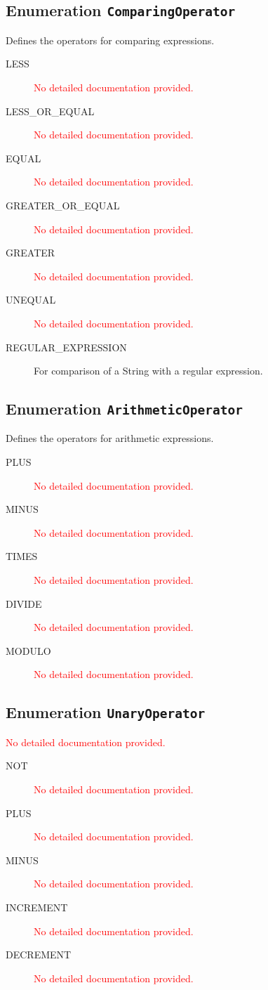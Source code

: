 \subsection{Enumeration \texttt{ComparingOperator}}
Defines the operators for comparing expressions.
\begin{description}
\item[LESS] \textcolor{red}{No detailed documentation provided.}
\item[LESS\_OR\_EQUAL] \textcolor{red}{No detailed documentation provided.}
\item[EQUAL] \textcolor{red}{No detailed documentation provided.}
\item[GREATER\_OR\_EQUAL] \textcolor{red}{No detailed documentation provided.}
\item[GREATER] \textcolor{red}{No detailed documentation provided.}
\item[UNEQUAL] \textcolor{red}{No detailed documentation provided.}
\item[REGULAR\_EXPRESSION] For comparison of a String with a regular expression.
\end{description}
\subsection{Enumeration \texttt{ArithmeticOperator}}
Defines the operators for arithmetic expressions.
\begin{description}
\item[PLUS] \textcolor{red}{No detailed documentation provided.}
\item[MINUS] \textcolor{red}{No detailed documentation provided.}
\item[TIMES] \textcolor{red}{No detailed documentation provided.}
\item[DIVIDE] \textcolor{red}{No detailed documentation provided.}
\item[MODULO] \textcolor{red}{No detailed documentation provided.}
\end{description}
\subsection{Enumeration \texttt{UnaryOperator}}
\textcolor{red}{No detailed documentation provided.}
\begin{description}
\item[NOT] \textcolor{red}{No detailed documentation provided.}
\item[PLUS] \textcolor{red}{No detailed documentation provided.}
\item[MINUS] \textcolor{red}{No detailed documentation provided.}
\item[INCREMENT] \textcolor{red}{No detailed documentation provided.}
\item[DECREMENT] \textcolor{red}{No detailed documentation provided.}
\end{description}
